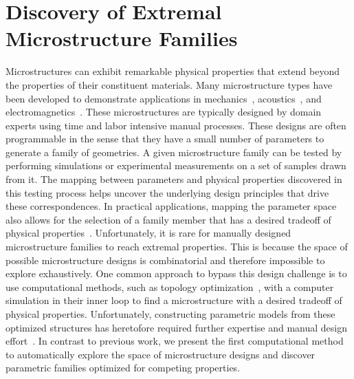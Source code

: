 \section{Discovery of Extremal Microstructure Families}
Microstructures can exhibit remarkable physical properties that extend beyond the properties of their constituent materials.
Many microstructure types have been developed to demonstrate applications
in mechanics~\citep{milton1995,kadic2012practicability,meza2014strong,zheng2014ultralight,li2016mechanical,wang2016lightweight},
acoustics~\citep{fang2006ultrasonic,li2009experimental}, 
and electromagnetics~\citep{schurig2006metamaterial,shalaev2007optical}.
These microstructures are typically designed by domain experts using time and labor intensive manual processes. These designs are often programmable in the sense that they have a small number of parameters to generate a family of geometries. A given microstructure family can be tested by performing simulations or experimental measurements on a set of samples drawn from it. The mapping between parameters and physical properties discovered in this testing process helps uncover the underlying design principles that drive these correspondences.
In practical applications, mapping the parameter space also allows for the selection of a family member that has a desired tradeoff of physical properties~\citep{gibson1982mechanics}.
Unfortunately, it is rare for manually designed microstructure families to reach extremal properties. This is because the space of possible microstructure designs is combinatorial and therefore impossible to explore exhaustively.
One common approach to bypass this design challenge is to use computational methods,
such as topology optimization~\citep{sigmund1994materials,vogiatzis2017topology}, with a computer simulation in their inner loop to find a microstructure with a desired tradeoff of physical properties.
Unfortunately, constructing parametric models from these optimized structures has heretofore required further expertise and manual design effort~\citep{clausen2015topology}.
In contrast to previous work, we present the first computational method to automatically explore the space of microstructure designs and discover parametric families optimized for competing properties.

